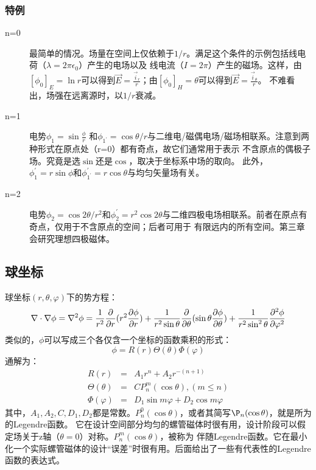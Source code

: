 \subsubsection{特例}
\begin{description}
  \item[n=0] 最简单的情况。场量在空间上仅依赖于$1/r$。满足这个条件的示例包括线电荷（$\lambda=2\pi \epsilon_0$）产生的电场以及
  线电流（$I=2\pi$）产生的磁场。这样，由$[\phi_0]_E=\ln r$可以得到$\vec{E}=\frac{\vec{i}_r}{r} $；由$[\phi_0]_H=\theta$可以得到$\vec{E}=\frac{\vec{i}_{\theta}}{r} $。
  不难看出，场强在远离源时，以$1/r$衰减。
\item[n=1] 电势$\phi_1=\sin \frac{\phi}{r}$ 和$\phi_{1^\prime}=\cos \theta/r$与二维电/磁偶电场/磁场相联系。注意到两种形式在原点处（r=0）都有奇点，故它们通常用于表示
不含原点的偶极子场。究竟是选$\sin$还是$\cos$，取决于坐标系中场的取向。
此外，$\phi_1^\prime=r \sin \phi$和$\phi_{1^\prime}^\prime=r \cos \theta$与均匀矢量场有关。
 \item[n=2] 电势$\phi_2=\cos 2\theta/r^2$和$\phi_2^\prime= r^2 \cos 2\theta$与二维四极电场相联系。前者在原点有奇点，仅用于不含原点的空间；后者可用于
 有限远内的所有空间。第三章会研究理想四极磁体。
\end{description}

\subsection{球坐标}
球坐标$(r, \theta, \varphi)$下的势方程：
\begin{equation}\label{eqn:laplace sph1}
  \nabla\cdot\nabla\phi=\nabla^2\phi=\frac{1}{r^2}\frac{\partial}{\partial r}(r^2\frac{\partial \phi}{\partial r})\\
  +\frac{1}{r^2\sin \theta}\frac{\partial}{\partial \theta}(\sin \theta\frac{\partial \phi}{\partial \theta})
  +\frac{1}{r^2\sin^2 \theta}\frac{\partial^2 \phi}{\partial \varphi^2}
\end{equation}
类似的，$\phi$可以写成三个各仅含一个坐标的函数乘积的形式：
\begin{equation*}\label{eqn:laplace sph2}
  \phi=R(r)\Theta(\theta)\Phi(\varphi)
\end{equation*}
通解为：
\begin{eqnarray}\label{eqn:laplace sph3}
R(r)&=&A_1 r^n+A_2 r^{-(n+1)} \nonumber \\
\Theta(\theta)&=&C P_n^m(\cos \theta), (m \le n)\nonumber \\
\Phi(\varphi)&=&D_1 \sin m\varphi +D_2 \cos m\varphi
\end{eqnarray}
其中，$A_1, A_2, C, D_1, D_2$都是常数。$P_n^0(\cos \theta)$，或者其简写$\P_n(\cos\theta)$，就是所为的Legendre函数。
它在设计空间部分均匀的螺管磁体时很有用，设计阶段可以假定场关于z轴（$\theta=0$）对称。$P_n^m(\cos\theta)$，被称为
伴随Legendre函数。它在最小化一个实际螺管磁体的设计“误差”时很有用。后面给出了一些有代表性的Legendre函数的表达式。

